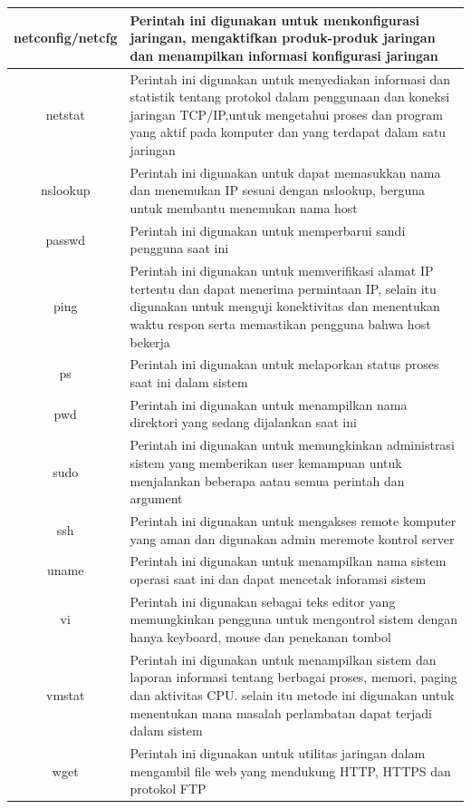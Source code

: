 \begin{table}[h]
\begin{tabular}{|c|l|}
			\hline
			netconfig/netcfg&Perintah ini digunakan untuk menkonfigurasi jaringan, mengaktifkan produk-produk jaringan dan menampilkan informasi konfigurasi jaringan\\
			\hline
			netstat&Perintah ini digunakan untuk menyediakan informasi dan statistik tentang protokol dalam penggunaan dan koneksi jaringan TCP/IP,untuk mengetahui proses dan program yang aktif pada komputer dan yang terdapat dalam satu jaringan\\
			\hline
			 nslookup&Perintah ini digunakan untuk dapat memasukkan nama dan menemukan IP sesuai dengan nslookup, berguna untuk membantu menemukan nama host\\
			\hline
			passwd&Perintah ini digunakan untuk memperbarui sandi pengguna saat ini\\
			\hline
			ping&Perintah ini digunakan untuk memverifikasi alamat IP tertentu dan dapat menerima permintaan IP, selain itu digunakan untuk menguji konektivitas dan menentukan waktu respon serta memastikan pengguna bahwa host bekerja\\
			\hline
			ps&Perintah ini digunakan untuk melaporkan status proses saat ini dalam sistem\\
			\hline
			pwd&Perintah ini digunakan untuk menampilkan nama direktori yang sedang dijalankan saat ini\\
			\hline
			sudo&Perintah ini digunakan untuk memungkinkan administrasi sistem yang memberikan user kemampuan untuk menjalankan beberapa aatau semua perintah dan argument\\
			\hline
			ssh&Perintah ini digunakan untuk mengakses remote komputer yang aman dan digunakan admin meremote kontrol server\\
			\hline
			uname&Perintah ini digunakan untuk menampilkan nama sistem operasi saat ini dan dapat mencetak inforamsi sistem\\
			\hline
			vi&Perintah ini digunakan sebagai teks editor yang memungkinkan pengguna untuk mengontrol sistem dengan hanya keyboard, mouse dan penekanan tombol \\
			\hline
			vmstat&Perintah ini digunakan untuk menampilkan sistem dan laporan informasi tentang berbagai proses, memori, paging dan aktivitas CPU. selain itu metode ini digunakan untuk menentukan mana masalah perlambatan dapat terjadi dalam sistem\\
			\hline
			wget&Perintah ini digunakan untuk utilitas jaringan dalam mengambil file web yang mendukung HTTP, HTTPS dan protokol FTP\\
			\hline
		\end{tabular}
		\end{table}